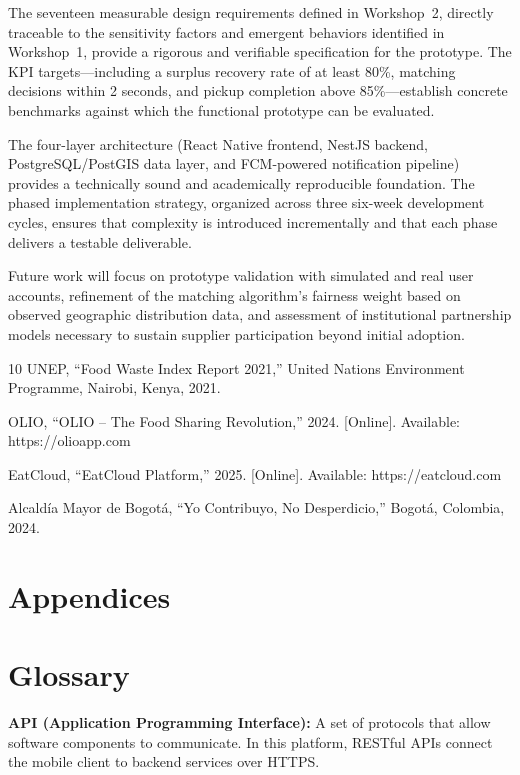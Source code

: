 \documentclass[conference]{IEEEtran}
\begin{document}
The seventeen measurable design requirements defined in Workshop~2, directly traceable to the sensitivity factors and emergent behaviors identified in Workshop~1, provide a rigorous and verifiable specification for the prototype. The KPI targets---including a surplus recovery rate of at least 80\%, matching decisions within 2 seconds, and pickup completion above 85\%---establish concrete benchmarks against which the functional prototype can be evaluated.

The four-layer architecture (React Native frontend, NestJS backend, PostgreSQL/PostGIS data layer, and FCM-powered notification pipeline) provides a technically sound and academically reproducible foundation. The phased implementation strategy, organized across three six-week development cycles, ensures that complexity is introduced incrementally and that each phase delivers a testable deliverable.

Future work will focus on prototype validation with simulated and real user accounts, refinement of the matching algorithm's fairness weight based on observed geographic distribution data, and assessment of institutional partnership models necessary to sustain supplier participation beyond initial adoption.




\begin{thebibliography}{10}
UNEP, ``Food Waste Index Report 2021,'' United Nations Environment Programme, Nairobi, Kenya, 2021.

OLIO, ``OLIO -- The Food Sharing Revolution,'' 2024. [Online]. Available: https://olioapp.com

EatCloud, ``EatCloud Platform,'' 2025. [Online]. Available: https://eatcloud.com

Alcaldía Mayor de Bogotá, ``Yo Contribuyo, No Desperdicio,'' Bogotá, Colombia, 2024.
\end{thebibliography}

\section{Appendices}

\section{Glossary}

\textbf{API (Application Programming Interface):} A set of protocols that allow software components to communicate. In this platform, RESTful APIs connect the mobile client to backend services over HTTPS.
\end{document}
